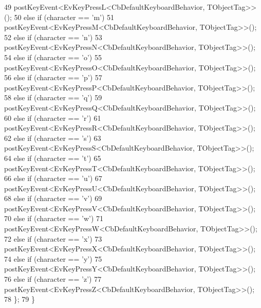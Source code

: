 \begin{DoxyCode}
49                 postKeyEvent<EvKeyPressL<CbDefaultKeyboardBehavior, TObjectTag>>();
50             \textcolor{keywordflow}{else} \textcolor{keywordflow}{if} (character == \textcolor{charliteral}{'m'})
51                 postKeyEvent<EvKeyPressM<CbDefaultKeyboardBehavior, TObjectTag>>();
52             \textcolor{keywordflow}{else} \textcolor{keywordflow}{if} (character == \textcolor{charliteral}{'n'})
53                 postKeyEvent<EvKeyPressN<CbDefaultKeyboardBehavior, TObjectTag>>();
54             \textcolor{keywordflow}{else} \textcolor{keywordflow}{if} (character == \textcolor{charliteral}{'o'})
55                 postKeyEvent<EvKeyPressO<CbDefaultKeyboardBehavior, TObjectTag>>();
56             \textcolor{keywordflow}{else} \textcolor{keywordflow}{if} (character == \textcolor{charliteral}{'p'})
57                 postKeyEvent<EvKeyPressP<CbDefaultKeyboardBehavior, TObjectTag>>();
58             \textcolor{keywordflow}{else} \textcolor{keywordflow}{if} (character == \textcolor{charliteral}{'q'})
59                 postKeyEvent<EvKeyPressQ<CbDefaultKeyboardBehavior, TObjectTag>>();
60             \textcolor{keywordflow}{else} \textcolor{keywordflow}{if} (character == \textcolor{charliteral}{'r'})
61                 postKeyEvent<EvKeyPressR<CbDefaultKeyboardBehavior, TObjectTag>>();
62             \textcolor{keywordflow}{else} \textcolor{keywordflow}{if} (character == \textcolor{charliteral}{'s'})
63                 postKeyEvent<EvKeyPressS<CbDefaultKeyboardBehavior, TObjectTag>>();
64             \textcolor{keywordflow}{else} \textcolor{keywordflow}{if} (character == \textcolor{charliteral}{'t'})
65                 postKeyEvent<EvKeyPressT<CbDefaultKeyboardBehavior, TObjectTag>>();
66             \textcolor{keywordflow}{else} \textcolor{keywordflow}{if} (character == \textcolor{charliteral}{'u'})
67                 postKeyEvent<EvKeyPressU<CbDefaultKeyboardBehavior, TObjectTag>>();
68             \textcolor{keywordflow}{else} \textcolor{keywordflow}{if} (character == \textcolor{charliteral}{'v'})
69                 postKeyEvent<EvKeyPressV<CbDefaultKeyboardBehavior, TObjectTag>>();
70             \textcolor{keywordflow}{else} \textcolor{keywordflow}{if} (character == \textcolor{charliteral}{'w'})
71                 postKeyEvent<EvKeyPressW<CbDefaultKeyboardBehavior, TObjectTag>>();
72             \textcolor{keywordflow}{else} \textcolor{keywordflow}{if} (character == \textcolor{charliteral}{'x'})
73                 postKeyEvent<EvKeyPressX<CbDefaultKeyboardBehavior, TObjectTag>>();
74             \textcolor{keywordflow}{else} \textcolor{keywordflow}{if} (character == \textcolor{charliteral}{'y'})
75                 postKeyEvent<EvKeyPressY<CbDefaultKeyboardBehavior, TObjectTag>>();
76             \textcolor{keywordflow}{else} \textcolor{keywordflow}{if} (character == \textcolor{charliteral}{'z'})
77                 postKeyEvent<EvKeyPressZ<CbDefaultKeyboardBehavior, TObjectTag>>();
78         \};
79     \}
\end{DoxyCode}
